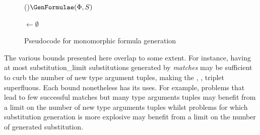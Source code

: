 \documentclass[runningheads]{llncs}
\begin{document}
\begin{figure}[t!]
\begin{algorithm}[H]
\Fn(){\(\GenFormulae(\Phi, S)\)}{




   \BlankLine

   \NewFormulae \(\leftarrow\emptyset\)\;

   \BlankLine


   \BlankLine

   \Return \NewFormulae
}
\end{algorithm}
\caption{Pseudocode for monomorphic formula generation}
\label{gen_formulae}
\end{figure}


The various bounds presented here overlap to some extent. For instance, having at most \textcolor{ourblueviolet}{substitution\_limit} substitutions generated by \emph{matches} may be sufficient to curb the number of new type argument tuples, making the \textcolor{ourblueviolet}{\MonoCap}, \textcolor{ourblueviolet}{\MonoMult}, \textcolor{ourblueviolet}{\MonoFloor} triplet superfluous. Each bound nonetheless has its uses. For example, problems that lead to few successful matches but many type arguments tuples may benefit from a limit on the number of new type arguments tuples whilst problems for which substitution generation is more explosive may benefit from a limit on the number of generated substitution.
\end{document}
